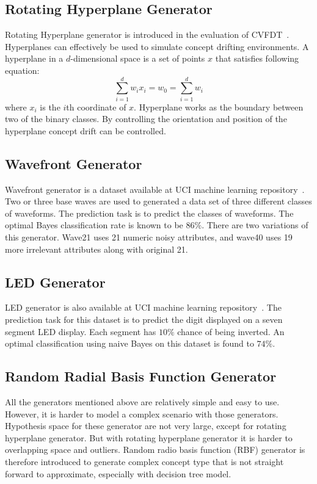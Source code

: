 \subsection*{Rotating Hyperplane Generator}
Rotating Hyperplane generator is introduced in the evaluation of CVFDT~\cite{hulten01:cvfdt}. Hyperplanes can effectively be used to simulate concept drifting environments. A hyperplane in a $d$-dimensional space is a set of points $x$ that satisfies following equation:
\[
    \sum_{i=1}^{d} w_i x_i = w_0 = \sum_{i=1}^{d} w_i
\]
where $x_i$ is the $i$th coordinate of $x$. Hyperplane works as the boundary between two of the binary classes. By controlling the orientation and position of the hyperplane concept drift can be controlled. 

\subsection*{Wavefront Generator}
Wavefront generator is a dataset available at UCI machine learning repository~\cite{internet:ucirepo}. Two or three base waves are used to generated a data set of three different classes of waveforms. The prediction task is to predict the classes of waveforms. The optimal Bayes classification rate is known to be $86\%$. There are two variations of this generator. Wave21 uses 21 numeric noisy attributes, and wave40 uses 19 more irrelevant attributes along with original 21.

\subsection*{LED Generator}
LED generator is also available at UCI machine learning repository~\cite{internet:ucirepo}. The prediction task for this dataset is to predict the digit displayed on a seven segment LED display. Each segment has $10\%$ chance of being inverted. An optimal classification using naive Bayes on this dataset is found to $74\%$. 

\subsection*{Random Radial Basis Function Generator}
All the generators mentioned above are relatively simple and easy to use. However, it is harder to model a complex scenario with those generators. Hypothesis space for these generator are not very large, except for rotating hyperplane generator. But with rotating hyperplane generator it is harder to overlapping space and outliers. Random radio basis function (RBF) generator is therefore introduced to generate complex concept type that is not straight forward to approximate, especially with decision tree model.

